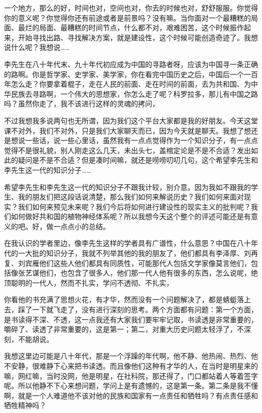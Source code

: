 \documentclass[UTF8, 12pt, a4paper]{ctexrep}
\begin{document}
一个地方，那么的好，时间也对，空间也对，你去的时候也对，舒舒服服。你觉得你的意义呢？你觉得你还有前途或者是前景吗？没有嘛。当你面对一个最糟糕的局面、最烂的局面、最糟糕的时间节点，什么都不对，艰难困苦，这个时候振作起来，开始寻找出路、寻找解决方案，就是建设性，这个时候可能创造奇迹了。我想说什么呢？我想说……

李先生在八十年代末、九十年代初应成为中国的寻路者呀，应该为中国寻一条正确的路啊。你是哲学家、史学家、美学家，你在看完中国历史之后，中国后一个一百年怎么走？你要拿着棍子，走在人民的前面、走在时间的前面，去为共和国、为中华民族去寻路啊，一个伟大的思想家，你怎么走了呢？科罗拉多，那儿有中国之路吗？虽然你走了，我不该进行这样的灵魂的拷问，

不过我想我多说两句也无所谓，因为我们这个平台大家都是我的好朋友。今天这堂课不对外，我们不对外，只是我们大家聊天而已，因为今天就是聊天。我想了想还是想说一些话，说一些心里话，虽然我有一点点觉得作为一个知识分子，有一点点觉得不是很礼貌，别人刚走这么几天，未出头七，盖棺定论是不是不合适？发出如此的疑问是不是不合适？但是凑时间嘛，就还是唠唠叨叨几句，这个希望李先生和李先生这一代的知识分子……

希望李先生和李先生这一代的知识分子不跟我计较，别介意。因为我如不跟我的学生、我的朋友们把这段话说清楚，那么我们如何来解说历史？我们如何来面对现实？我们如何来预见未来呢？我们今后将如何进行建设性的现实主义的批判呢？我们如何做好共和国的植物神经体系呢？所以我想今天这个整个的评述可能还是有意义的吧。好，做一点点小的总结。

在我认识的学者里边，像李先生这样的学者具有广谱性，什么意思？中国在八十年代的一大批的知识分子，我就不列举其他的我的朋友了，他们都具有李泽厚、刘再复、刘宾雁他们这些人他们都具有同质性，可能那代人包括文学家像莫言他们，包括像张艺谋他们，也包含了很多人，他们那一代人他有很多的东西，怎么说呢，绝顶聪明的一代人，然而不扎实，学问不透彻、不扎实，

你看他的书充满了思想火花，有才华，然而没有一个问题解决了，都是蜻蜓落上去，踩了一下就飞走了，没有进行深刻的思考。两个方面都有问题：第一个方面，是书读得不深、不透，这一点我还有大家我们要牢牢记取，书读透是非常重要的，嚼碎了、读透了非常重要的，这是第一；第二，对重大历史问题太轻浮了，不深刻，不能胡说。

我想这里边可能是八十年代，那是一个浮躁的年代啊，他不静、他热闹、热烈、他不安静，很难静下心来把书读透。而且像他们这种有才华的人，在当时是明星来的嘛，网红嘛，当时没网，他是明星，在社科院，那还得了，门口都站着人等着签字呢。所以他静不下心来想问题，学问上是有遗憾的，这是第一条。第二条是我不懂啊，就是一个人难道他不该对他的民族和国家有一点责任和牺牲吗？有点责任感和牺牲精神吗？
\end{document}
